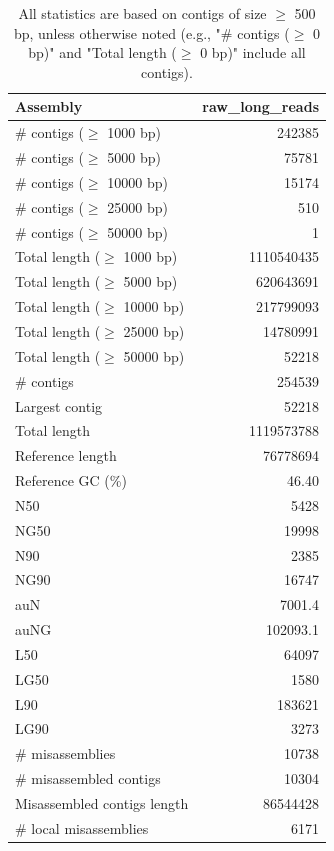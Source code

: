 \documentclass[12pt,a4paper]{article}
\begin{document}
\begin{table}[ht]
\begin{center}
\caption{All statistics are based on contigs of size $\geq$ 500 bp, unless otherwise noted (e.g., "\# contigs ($\geq$ 0 bp)" and "Total length ($\geq$ 0 bp)" include all contigs).}
\begin{tabular}{|l*{1}{|r}|}
\hline
Assembly & raw\_long\_reads \\ \hline
\# contigs ($\geq$ 1000 bp) & 242385 \\ \hline
\# contigs ($\geq$ 5000 bp) & 75781 \\ \hline
\# contigs ($\geq$ 10000 bp) & 15174 \\ \hline
\# contigs ($\geq$ 25000 bp) & 510 \\ \hline
\# contigs ($\geq$ 50000 bp) & 1 \\ \hline
Total length ($\geq$ 1000 bp) & 1110540435 \\ \hline
Total length ($\geq$ 5000 bp) & 620643691 \\ \hline
Total length ($\geq$ 10000 bp) & 217799093 \\ \hline
Total length ($\geq$ 25000 bp) & 14780991 \\ \hline
Total length ($\geq$ 50000 bp) & 52218 \\ \hline
\# contigs & 254539 \\ \hline
Largest contig & 52218 \\ \hline
Total length & 1119573788 \\ \hline
Reference length & 76778694 \\ \hline
Reference GC (\%) & 46.40 \\ \hline
N50 & 5428 \\ \hline
NG50 & 19998 \\ \hline
N90 & 2385 \\ \hline
NG90 & 16747 \\ \hline
auN & 7001.4 \\ \hline
auNG & 102093.1 \\ \hline
L50 & 64097 \\ \hline
LG50 & 1580 \\ \hline
L90 & 183621 \\ \hline
LG90 & 3273 \\ \hline
\# misassemblies & 10738 \\ \hline
\# misassembled contigs & 10304 \\ \hline
Misassembled contigs length & 86544428 \\ \hline
\# local misassemblies & 6171 \\ \hline

\end{tabular}
\end{center}
\end{table}
\end{document}
